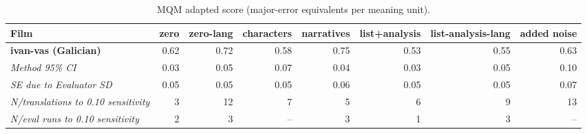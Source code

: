 \begin{table}[ht]
\centering
\begin{adjustbox}{width=\textwidth}
\begin{tabular}{lrrrrrr|r}
Film & zero & zero-lang & characters & narratives & list+analysis & list-analysis-lang & added noise \\
\hline
\textbf{ivan-vas (Galician)} & 0.62 & 0.72 & 0.58 & 0.75 & 0.53 & 0.55 & 0.63 \\

\emph{Method 95\% CI} & 0.03 & 0.05 & 0.07 & 0.04 & 0.03 & 0.05 & 0.10 \\

\emph{SE due to Evaluator SD} & 0.05 & 0.05 & 0.05 & 0.06 & 0.05 & 0.05 & 0.07 \\

\emph{N/translations to 0.10 sensitivity} & 3 & 12 & 7 & 5 & 6 & 9 & 13 \\

\emph{N/eval runs to 0.10 sensitivity} & 2 & 3 & -- & 3 & 1 & 3 & -- \\

\hline
\end{tabular}
\end{adjustbox}
\caption{MQM adapted score (major-error equivalents per meaning unit).}
\label{tab:mqm-method-comparison}
\end{table}
